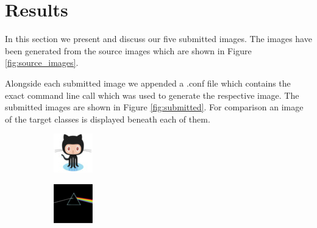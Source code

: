 
\section{Results}\label{sec:results}

In this section we present and discuss our five submitted images. The images have been generated from the source images which are shown in Figure \ref{fig:source_images}.

Alongside each submitted image we appended a .conf file which contains the exact command line call which was used to generate the respective image. The submitted images are shown in Figure \ref{fig:submitted}. For comparison an image of the target classes is displayed beneath each of them.

\begin{figure}
\centering
\begin{subfigure}{.19\linewidth}
  \centering
  \includegraphics[width=0.7\linewidth]{imgs/octocat}
\end{subfigure}
\begin{subfigure}{.19\linewidth}
  \centering
  \includegraphics[width=0.7\linewidth]{imgs/darkside}

\end{subfigure}
\end{figure}
